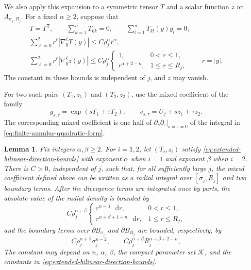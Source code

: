 \documentclass[11pt]{article}
\numberwithin{equation}{section}
\newtheorem{lemma}[theorem]{Lemma}
\theoremstyle{remark}
\newcommand{\dd}{\mathop{}\!\mathrm{d}}
\begin{document}
{We also apply this expansion to a symmetric tensor \(T\) and a
scalar function \(z\) on \(A_{\sigma_j,R_j}\). For a fixed
\(\alpha\ge2\), suppose that}
\begin{equation}\label{eq:extended-bilinear-direction-bounds}
 \begin{gathered}
 T=T^{\mathsf T},\qquad
 \sum_{k=1}^nT_{kk}=0,\qquad
 \sum_{l=1}^nT_{kl}(y)y_l=0,\\
 \sum_{\ell=0}^2r^\ell|\nabla_y^\ell T(y)|
 \le C\rho_j^\alpha r^\alpha,\\
 \sum_{\ell=0}^2r^\ell|\nabla_y^\ell z(y)|
 \le C\rho_j^\alpha
 \begin{cases}
  1,&0<r\le1,\\
  r^{\alpha+2-n},&1\le r\le R_j,
 \end{cases}
 \qquad r=|y|.
 \end{gathered}
\end{equation}
{The constant in these bounds is independent of \(j\), and \(z\)
may vanish.}

For two such pairs \((T_1,z_1)\) and \((T_2,z_2)\), use the mixed
coefficient of the family
\[
 g_{s,\tau}=\exp(sT_1+\tau T_2),\qquad
 v_{s,\tau}=U_j+sz_1+\tau z_2.
\]
{The corresponding mixed coefficient is one half of
\(\partial_s\partial_\tau|_{s=\tau=0}\) of the integral in
\eqref{eq:finite-annulus-quadratic-form}.}

\begin{lemma}\label{lem:annular-bilinear-density}
{Fix integers \(\alpha,\beta\ge2\). For \(i=1,2\), let
\((T_i,z_i)\) satisfy \eqref{eq:extended-bilinear-direction-bounds} with
exponent \(\alpha\) when \(i=1\) and exponent \(\beta\) when \(i=2\).
There is \(C>0\), independent of \(j\), such that, for all sufficiently
large \(j\), the mixed coefficient defined above can be written as a radial integral over
\([\sigma_j,R_j]\) and two boundary terms. After the divergence terms are
integrated once by parts, the absolute value of the radial density is bounded
by}
\begin{equation}\label{eq:annular-bilinear-density}
 C\rho_j^{\alpha+\beta}
 \begin{cases}
  r^{n-3}\,\dd r,&0<r\le1,\\
  r^{\alpha+\beta+1-n}\,\dd r,&1\le r\le R_j,
 \end{cases}
\end{equation}
{and the boundary terms over \(\partial B_{\sigma_j}\) and
\(\partial B_{R_j}\) are bounded, respectively, by}
\begin{equation}\label{eq:annular-bilinear-boundary-density}
 C\rho_j^{\alpha+\beta}\sigma_j^{n-2},\qquad
 C\rho_j^{\alpha+\beta}R_j^{\alpha+\beta+2-n},
\end{equation}
{The constant may depend on \(n\), \(\alpha\), \(\beta\), the
compact parameter set \(\mathcal K\), and the constants in
\eqref{eq:extended-bilinear-direction-bounds}.}
\end{lemma}
\end{document}
